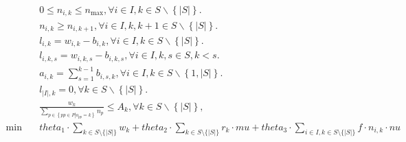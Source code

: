 \begin{align}
  & 0 \leq n_{i , k} \leq n_{\text{max}} , \forall i \in I , k \in S \backslash \left\{\left|S\right|\right\} . \tag{eq\_0001} \\
  & n_{i , k} \geq n_{i , k + 1} , \forall i \in I , k , k + 1 \in S \backslash \left\{\left|S\right|\right\} . \tag{eq\_0002} \\
  & l_{i , k} = w_{i , k} - b_{i , k} , \forall i \in I , k \in S \backslash \left\{\left|S\right|\right\} . \tag{eq\_0008} \\
  & l_{i , k , s} = w_{i , k , s} - b_{i , k , s} , \forall i \in I , k , s \in S , k < s . \tag{eq\_0011} \\
  & a_{i , k} = \sum_{s = 1}^{k - 1} b_{i , s , k} , \forall i \in I , k \in S \backslash \left\{1 , \left|S\right|\right\} . \tag{eq\_0012} \\
  & l_{\left|I\right| , k} = 0 , \forall k \in S \backslash \left\{\left|S\right|\right\} . \tag{eq\_0013} \\
  & \frac{w_{k}}{\underset{p \in \left\{\right. pp \in P \left|\right. o_{pp} = k \left.\right\}}{\sum} n_{p}} \leq A_{k} , \forall k \in S \backslash \left\{\left|S\right|\right\} , \tag{eq\_0018} \\
  \min\quad & \mathit{theta}_{1} \cdot \sum_{k \in S \setminus \{|S|\}} w_{k} + \mathit{theta}_{2} \cdot \sum_{k \in S \setminus \{|S|\}} r_{k} \cdot \mathit{mu} + \mathit{theta}_{3} \cdot \sum_{i \in I, k \in S \setminus \{|S|\}} f \cdot n_{i , k} \cdot \mathit{nu} \tag{eq\_0019} \\
\end{align}
